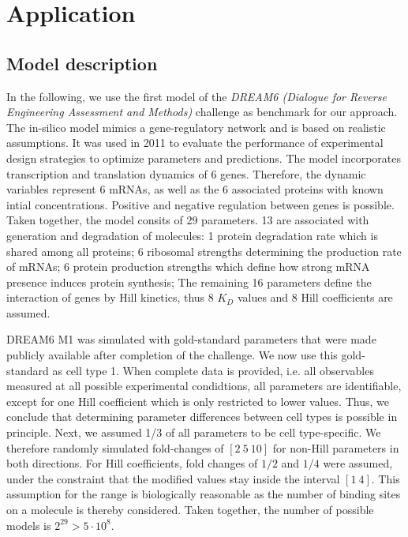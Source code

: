 \documentclass{bioinfo}
\begin{document}


\section{Application}
\subsection{Model description}
In the following, we use the first model of the \emph{DREAM6 (Dialogue for Reverse Engineering Assessment and Methods)} challenge as benchmark for our approach.
The in-silico model mimics a gene-regulatory network and is based on realistic assumptions.
It was used in 2011 to evaluate the performance of experimental design strategies to optimize parameters and predictions.
The model incorporates transcription and translation dynamics of 6 genes.
Therefore, the dynamic variables represent 6 mRNAs, as well as the 6 associated proteins with known intial concentrations.
Positive and negative regulation between genes is possible.
Taken together, the model consits of 29 parameters.
13 are associated with generation and degradation of molecules:
1 protein degradation rate which is shared among all proteins; 
6 ribosomal strengths determining the production rate of mRNAs;
6 protein production strengths which define how strong mRNA presence induces protein synthesis;
The remaining 16 parameters define the interaction of genes by Hill kinetics, thus 8 $K_D$ values and 8 Hill coefficients are assumed.

DREAM6 M1 was simulated with gold-standard parameters that were made publicly available after completion of the challenge.
We now use this gold-standard as cell type 1.
When complete data is provided, i.e. all observables measured at all possible experimental condidtions, all parameters are identifiable, except for one Hill coefficient which is only restricted to lower values.
Thus, we conclude that determining parameter differences between cell types is possible in principle.
Next, we assumed 1/3 of all parameters to be cell type-specific.
We therefore randomly simulated fold-changes of $[2~5~10]$ for non-Hill parameters in both directions.
For Hill coefficients, fold changes of $1/2$ and $1/4$ were assumed, under the constraint that the modified values stay inside the interval $[1~4]$.
This assumption for the range is biologically reasonable as the number of binding sites on a molecule is thereby considered.
Taken together, the number of possible models is $2^{29}>5\cdot10^8$.
\end{document}
